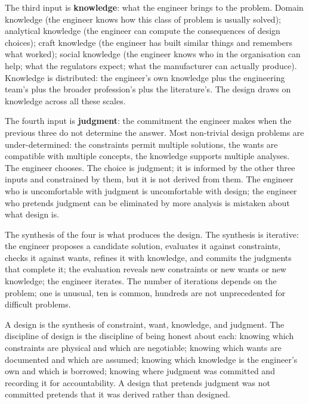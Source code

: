 The third input is \textbf{knowledge}: what the engineer brings to the problem. Domain knowledge (the engineer knows how this class of problem is usually solved); analytical knowledge (the engineer can compute the consequences of design choices); craft knowledge (the engineer has built similar things and remembers what worked); social knowledge (the engineer knows who in the organisation can help; what the regulators expect; what the manufacturer can actually produce). Knowledge is distributed: the engineer's own knowledge plus the engineering team's plus the broader profession's plus the literature's. The design draws on knowledge across all these scales.

The fourth input is \textbf{judgment}: the commitment the engineer makes when the previous three do not determine the answer. Most non-trivial design problems are under-determined: the constraints permit multiple solutions, the wants are compatible with multiple concepts, the knowledge supports multiple analyses. The engineer chooses. The choice is judgment; it is informed by the other three inputs and constrained by them, but it is not derived from them. The engineer who is uncomfortable with judgment is uncomfortable with design; the engineer who pretends judgment can be eliminated by more analysis is mistaken about what design is.

The synthesis of the four is what produces the design. The synthesis is iterative: the engineer proposes a candidate solution, evaluates it against constraints, checks it against wants, refines it with knowledge, and commits the judgments that complete it; the evaluation reveals new constraints or new wants or new knowledge; the engineer iterates. The number of iterations depends on the problem; one is unusual, ten is common, hundreds are not unprecedented for difficult problems.

\begin{principle}
A design is the synthesis of constraint, want, knowledge, and judgment. The discipline of design is the discipline of being honest about each: knowing which constraints are physical and which are negotiable; knowing which wants are documented and which are assumed; knowing which knowledge is the engineer's own and which is borrowed; knowing where judgment was committed and recording it for accountability. A design that pretends judgment was not committed pretends that it was derived rather than designed.
\end{principle}

